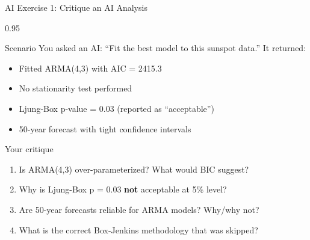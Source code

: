 \documentclass[9pt, aspectratio=169, t]{beamer}
\begin{document}
\begin{frame}{AI Exercise 1: Critique an AI Analysis}
    \begin{cminipage}{0.95\textwidth}
    \begin{block}{Scenario}
        You asked an AI: ``Fit the best model to this sunspot data.'' It returned:
        \begin{itemize}\setlength{\itemsep}{0pt}
            \item Fitted ARMA(4,3) with AIC = 2415.3
            \item No stationarity test performed
            \item Ljung-Box p-value = 0.03 (reported as ``acceptable'')
            \item 50-year forecast with tight confidence intervals
        \end{itemize}
    \end{block}

    \vspace{0.2cm}
    \begin{alertblock}{Your critique}
        \begin{enumerate}\setlength{\itemsep}{0pt}
            \item Is ARMA(4,3) over-parameterized? What would BIC suggest?
            \item Why is Ljung-Box p = 0.03 \textbf{not} acceptable at 5\% level?
            \item Are 50-year forecasts reliable for ARMA models? Why/why not?
            \item What is the correct Box-Jenkins methodology that was skipped?
        \end{enumerate}
    \end{alertblock}
    \end{cminipage}
\end{frame}
\end{document}

